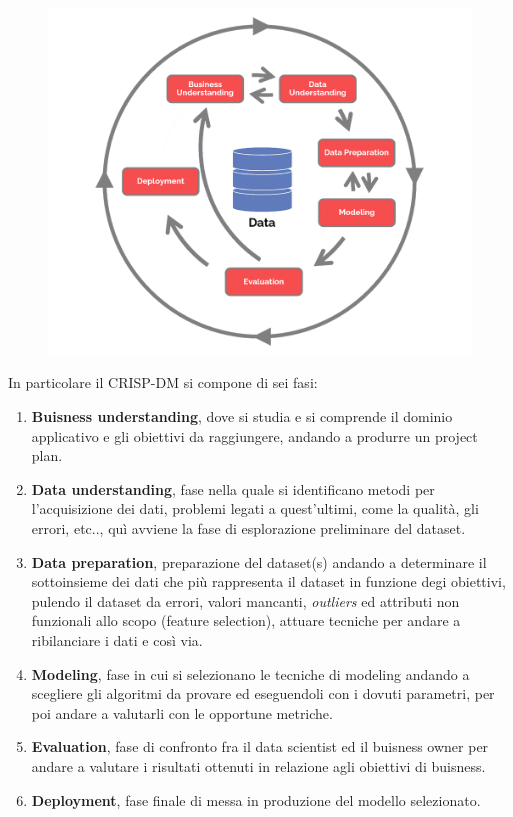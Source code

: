 \documentclass[italian,12pt,a4paper]{article}
\begin{document}
	\begin{figure}[h]
		\centering
		\includegraphics[scale=0.3]{CRISP-DM}
	\end{figure}

	In particolare il CRISP-DM si compone di sei fasi:
	
	\begin{enumerate}
		\item \textbf{Buisness understanding}, dove si studia e si comprende il dominio applicativo e gli obiettivi da raggiungere, andando a produrre un project plan.
		\item \textbf{Data understanding}, fase nella quale si identificano metodi per l'acquisizione dei dati, problemi legati a quest'ultimi, come la qualità, gli errori, etc.., quì avviene la fase di esplorazione preliminare del dataset.
		\item \textbf{Data preparation}, preparazione del dataset(s) andando a determinare il sottoinsieme dei dati che più rappresenta il dataset in funzione degi obiettivi, pulendo il dataset da errori, valori mancanti, \textit{outliers} ed attributi non funzionali allo scopo (feature selection), attuare tecniche per andare a ribilanciare i dati e così via.
		\item \textbf{Modeling}, fase in cui si selezionano le tecniche di modeling andando a scegliere gli algoritmi da provare ed eseguendoli con i dovuti parametri, per poi andare a valutarli con le opportune metriche.
		\item \textbf{Evaluation}, fase di confronto fra il data scientist ed il buisness owner per andare a valutare i risultati ottenuti in relazione agli obiettivi di buisness.
		\item \textbf{Deployment}, fase finale di messa in produzione del modello selezionato.
	\end{enumerate}
\end{document}
